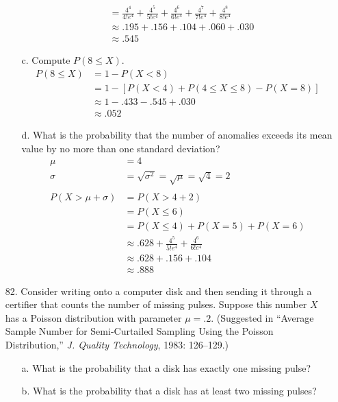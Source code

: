 \documentclass[letterpaper,12pt]{article}
\begin{document}
\begin{enumerate}
\begin{enumerate}
\begin{align*}
          &= \frac{4^4}{4!e^4} + \frac{4^5}{5!e^4} + \frac{4^6}{6!e^4} + \frac{4^7}{7!e^4} + \frac{4^8}{8!e^4} \\
          &\approx .195 + .156 + .104 + .060 + .030 \\
          &\approx .545
        \end{align*}
      \item[c.]
        Compute $P(8 \le X)$.
        \begin{align*}
          P(8 \le X) &= 1 - P(X < 8) \\
          &= 1 - [P(X < 4) + P(4 \le X \le 8) - P(X = 8)] \\
          &\approx 1 - .433  - .545 + .030 \\
          &\approx .052
        \end{align*}
      \item[d.]
        What is the probability that the number of anomalies exceeds its mean value by no more than one standard deviation?
        \begin{align*}
          \mu &= 4 \\
          \sigma &= \sqrt{\sigma^2} = \sqrt{\mu} = \sqrt{4} = 2 \\
          \\
          P(X > \mu + \sigma) &= P(X > 4 + 2) \\
          &= P(X \le 6) \\
          &= P(X \le 4) + P(X = 5) + P(X = 6) \\
          &\approx .628 + \frac{4^5}{5!e^4} + \frac{4^6}{6!e^4} \\
          &\approx .628 + .156 + .104 \\
          &\approx .888
        \end{align*}
    \end{enumerate}
  \item[82.]
    Consider writing onto a computer disk and then sending it through a certifier that counts the number of missing pulses. Suppose this number $X$ has a Poisson distribution with parameter $\mu = .2$. (Suggested in ``Average Sample Number for Semi-Curtailed Sampling Using the Poisson Distribution,'' \textit{J. Quality Technology}, 1983: 126–129.)
    \begin{enumerate}
      \item[a.]
        What is the probability that a disk has exactly one missing pulse?
      \item[b.]
        What is the probability that a disk has at least two missing pulses?

\end{enumerate}
\end{enumerate}
\end{document}
